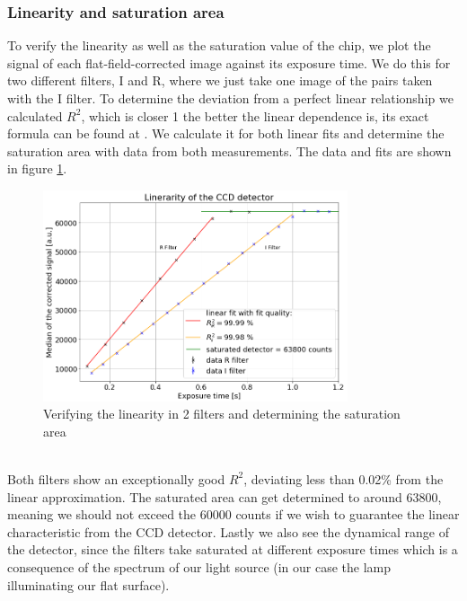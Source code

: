 \subsubsection{Linearity and saturation area}
To verify the linearity as well as the saturation value of the chip, we plot the signal of each flat-field-corrected image against its exposure time. We do this for two different filters, I and R, where we just take one image of the pairs taken with the I filter. To determine the deviation from a perfect linear relationship we calculated  $R^2$, which is closer 1 the better the linear dependence is, its exact formula can be found at \cite{rsq}. We calculate it for both linear fits and determine the saturation area with data from both measurements. The data and fits are shown in figure \ref{lin}.
\begin{figure}[h]
	\centering
	\includegraphics[width=0.8\textwidth]{report_pictures/Linearity.png}
	\caption{Verifying the linearity in 2 filters and determining the saturation area}
	\label{lin}
\end{figure}
\vspace{2mm}\\
Both filters show an exceptionally good $R^2$, deviating less than 0.02\% from the linear approximation. The saturated area can get determined to around 63800, meaning we should not exceed the 60000 counts if we wish to guarantee the linear characteristic from the CCD detector. Lastly we also see the dynamical range of the detector, since the filters take saturated at different exposure times which is a consequence of the spectrum of our light source (in our case the lamp illuminating our flat surface). 
\vspace{4mm}
